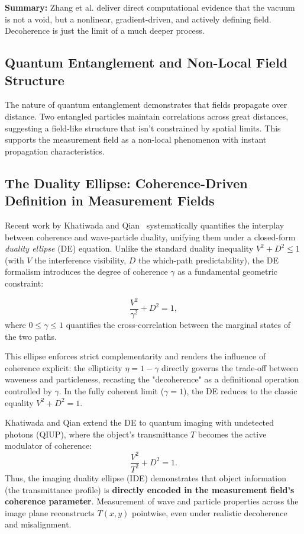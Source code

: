 \textbf{Summary:}  
Zhang et al. deliver direct computational evidence that the vacuum is not a void, but a nonlinear, gradient-driven, and actively defining field. Decoherence is just the limit of a much deeper process.


\subsection{Quantum Entanglement and Non-Local Field Structure}


The nature of quantum entanglement demonstrates that fields propagate over distance. Two entangled particles maintain correlations across great distances, suggesting a field-like structure that isn't constrained by spatial limits. This supports the measurement field as a non-local phenomenon with instant propagation characteristics.

\subsection*{The Duality Ellipse: Coherence-Driven Definition in Measurement Fields}

Recent work by Khatiwada and Qian~\cite{khatiwada_wave-particle_2025} systematically quantifies the interplay between coherence and wave-particle duality, unifying them under a closed-form \textit{duality ellipse} (DE) equation. Unlike the standard duality inequality $V^2 + D^2 \leq 1$ (with $V$ the interference visibility, $D$ the which-path predictability), the DE formalism introduces the degree of coherence $\gamma$ as a fundamental geometric constraint:

\begin{equation}
\frac{V^2}{\gamma^2} + D^2 = 1,
\end{equation}
where $0 \leq \gamma \leq 1$ quantifies the cross-correlation between the marginal states of the two paths.

This ellipse enforces strict complementarity and renders the influence of coherence explicit: the ellipticity $\eta = 1 - \gamma$ directly governs the trade-off between waveness and particleness, recasting the "decoherence" as a definitional operation controlled by $\gamma$. In the fully coherent limit ($\gamma = 1$), the DE reduces to the classic equality $V^2 + D^2 = 1$.

Khatiwada and Qian extend the DE to quantum imaging with undetected photons (QIUP), where the object's transmittance $T$ becomes the active modulator of coherence:
\begin{equation}
\frac{V^2}{T^2} + D^2 = 1.
\end{equation}
Thus, the imaging duality ellipse (IDE) demonstrates that object information (the transmittance profile) is \textbf{directly encoded in the measurement field's coherence parameter}. Measurement of wave and particle properties across the image plane reconstructs $T(x, y)$ pointwise, even under realistic decoherence and misalignment.

